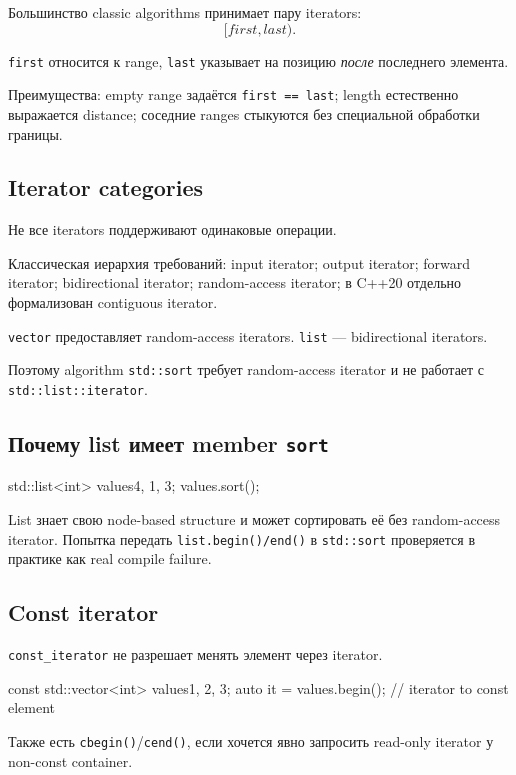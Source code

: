 Большинство classic algorithms принимает пару iterators:
\[
[first, last).
\]

\texttt{first} относится к range, \texttt{last} указывает на позицию
\emph{после} последнего элемента.

Преимущества:
empty range задаётся \texttt{first == last}; length естественно выражается distance; соседние ranges стыкуются без специальной обработки границы.

\subsection{Iterator categories}

Не все iterators поддерживают одинаковые операции.

Классическая иерархия требований:
input iterator; output iterator; forward iterator; bidirectional iterator; random-access iterator; в C++20 отдельно формализован contiguous iterator.

\texttt{vector} предоставляет random-access iterators.
\texttt{list} --- bidirectional iterators.

Поэтому algorithm \texttt{std::sort} требует random-access iterator и не
работает с \texttt{std::list::iterator}.

\subsection{Почему list имеет member \texttt{sort}}

\begin{cppcode}
std::list<int> values{4, 1, 3};
values.sort();
\end{cppcode}

List знает свою node-based structure и может сортировать её без random-access
iterator. Попытка передать \texttt{list.begin()/end()} в \texttt{std::sort}
проверяется в практике как real compile failure.

\subsection{Const iterator}

\texttt{const\_iterator} не разрешает менять элемент через iterator.

\begin{cppcode}
const std::vector<int> values{1, 2, 3};
auto it = values.begin(); // iterator to const element
\end{cppcode}

Также есть \texttt{cbegin()}/\texttt{cend()}, если хочется явно запросить
read-only iterator у non-const container.


